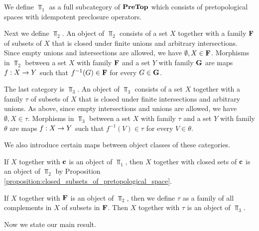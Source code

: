 We define $\Top_1$ as a full subcategory of $\mathbf{PreTop}$ which consists of pretopological spaces with idempotent preclosure operators.

Next we define $\Top_2$. An object of $\Top_2$ consists of a set $X$ together with a family $\mathbf{F}$ of subsets of $X$ that is closed under finite unions and arbitrary intersections. Since empty unions and intersections are allowed, we have $\emptyset,X \in \mathbf{F}$. Morphisms in $\Top_2$ between a set $X$ with family $\mathbf{F}$ and a set $Y$ with family $\mathbf{G}$ are maps $f:X\rightarrow Y$ such that $f^{-1}(G) \in \mathbf{F}$ for every $G \in \mathbf{G}$.

The last category is $\Top_3$. An object of $\Top_3$ consists of a set $X$ together with a family $\tau$ of subsets of $X$ that is closed under finite intersections and arbitrary unions. As above, since empty intersections and unions are allowed, we have $\emptyset, X \in \tau$. Morphisms in $\Top_3$ between a set $X$ with family $\tau$ and a set $Y$ with family $\theta$ are maps $f:X\rightarrow Y$ such that $f^{-1}(V) \in \tau$ for every $V \in \theta$.

We also introduce certain maps between object classes of these categories.

If $X$ together with $\mathbf{c}$ is an object of $\Top_1$, then $X$ together with closed sets of $\mathbf{c}$ is an object of $\Top_2$ by Proposition \ref{proposition:closed_subsets_of_pretopological_space}.

If $X$ together with $\mathbf{F}$ is an object of $\Top_2$, then we define $\tau$ as a family of all complements in $X$ of subsets in $\mathbf{F}$. Then $X$ together with $\tau$ is an object of $\Top_3$.

Now we state our main result.


